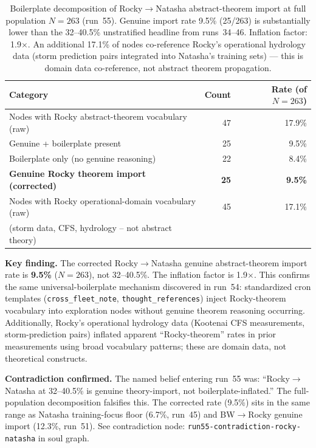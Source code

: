 \documentclass[11pt]{article}
\begin{document}
\begin{table}[h]
\centering
\begin{tabular}{lrr}
\toprule
Category & Count & Rate (of $N=263$) \\
\midrule
Nodes with Rocky abstract-theorem vocabulary (raw) & 47 & 17.9\% \\
\quad Genuine + boilerplate present & 25 & 9.5\% \\
\quad Boilerplate only (no genuine reasoning) & 22 & 8.4\% \\
\midrule
\textbf{Genuine Rocky theorem import (corrected)} & \textbf{25} & \textbf{9.5\%} \\
\midrule
Nodes with Rocky operational-domain vocabulary (raw) & 45 & 17.1\% \\
\quad (storm data, CFS, hydrology -- not abstract theory) & & \\
\bottomrule
\end{tabular}
\caption{Boilerplate decomposition of Rocky$\to$Natasha abstract-theorem import at full
population $N=263$ (run~55). Genuine import rate 9.5\% (25/263) is substantially lower
than the 32--40.5\% unstratified headline from runs~34--46. Inflation factor: 1.9$\times$.
An additional 17.1\% of nodes co-reference Rocky's operational hydrology data (storm
prediction pairs integrated into Natasha's training sets) --- this is domain data
co-reference, not abstract theorem propagation.}
\end{table}

\textbf{Key finding.} The corrected Rocky$\to$Natasha genuine abstract-theorem import rate is
\textbf{9.5\%} ($N=263$), not 32--40.5\%. The inflation factor is 1.9$\times$.
This confirms the same universal-boilerplate mechanism discovered in run~54:
standardized cron templates (\texttt{cross\_fleet\_note}, \texttt{thought\_references})
inject Rocky-theorem vocabulary into exploration nodes without genuine theorem reasoning
occurring. Additionally, Rocky's operational hydrology data (Kootenai CFS measurements,
storm-prediction pairs) inflated apparent ``Rocky-theorem'' rates in prior measurements
using broad vocabulary patterns; these are domain data, not theoretical constructs.

\textbf{Contradiction confirmed.} The named belief entering run~55 was: ``Rocky$\to$Natasha
at 32--40.5\% is genuine theory-import, not boilerplate-inflated.'' The full-population
decomposition falsifies this. The corrected rate (9.5\%) sits in the same range as
Natasha training-focus floor (6.7\%, run~45) and BW$\to$Rocky genuine import (12.3\%,
run~51). See contradiction node: \texttt{run55-contradiction-rocky-natasha} in soul graph.
\end{document}
